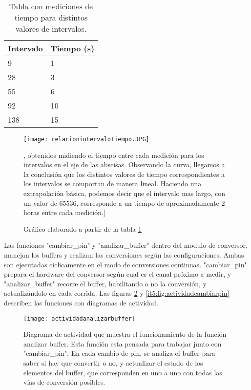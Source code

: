 \begin{table}[h]
\centering
\caption{Tabla con mediciones de tiempo para distintos valores de intervalos.}
\label{it5:tab:tablamediciones}
\begin{tabular}{|l|l|}
\hline
\rowcolor[HTML]{34CDF9} 
Intervalo & Tiempo (s) \\ \hline
\rowcolor[HTML]{CBF3FF} 
9         & 1          \\ \hline
\rowcolor[HTML]{CBF3FF} 
28        & 3          \\ \hline
\rowcolor[HTML]{CBF3FF} 
55        & 6          \\ \hline
\rowcolor[HTML]{CBF3FF} 
92        & 10         \\ \hline
\rowcolor[HTML]{CBF3FF} 
138       & 15         \\ \hline
\end{tabular}
\end{table}

\begin{figure}[h]
  \centering
  \texttt{[image: relacionintervalotiempo.JPG]}
  \caption{Gráfico elaborado a partir de la tabla \ref{it5:tab:tablamediciones}}, obtenidos midiendo el tiempo entre cada medición para los intervalos en el eje de las abscisas. Observando la curva, llegamos a la conclusión que los distintos valores de tiempo correspondientes a los intervalos se comportan de manera lineal. Haciendo una extrapolación básica, podemos decir que el intervalo mas largo, con un valor de 65536, corresponde a un tiempo de aproximadamente 2 horas entre cada medición.]\label{it5:fig:relacionintervalotiempo}
\end{figure}

Las funciones "cambiar\_pin" y "analizar\_buffer" dentro del modulo de conversor, manejan los buffers y realizan las conversiones según las configuraciones. Ambas son ejecutadas cíclicamente en el modo de conversiones continuas. "cambiar\_pin" prepara el hardware del conversor según cual es el canal próximo a medir, y "analizar\_buffer" recorre el buffer, habilitando o no la conversión, y actualizándolo en cada corrida. Las figuras \ref{it5:fig:actividadanalizarbuffer} y \ref{it5:fig:actividadcambiarpin} describen las funciones con diagramas de actividad.
 
\begin{figure}[h]
  \centering
  \texttt{[image: actividadanalizarbuffer]}
  \caption[Diagrama de actividad de la función analizar buffer]{Diagrama de actividad que muestra el funcionamiento de la función analizar buffer. Esta función esta pensada para trabajar junto con "cambiar\_pin". En cada cambio de pin, se analiza el buffer para saber si hay que convertir o no, y actualizar el estado de los elementos del buffer, que corresponden en uno a uno con todas las vías de conversión posibles.}\label{it5:fig:actividadanalizarbuffer}
\end{figure}



